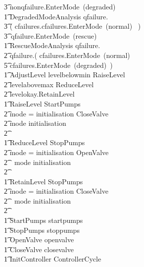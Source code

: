 \documentclass{report} %
\begin{document}
\begin{circus}
            \t3 nonqfailure.\true \then EnterMode~(degraded) \\
        \t1 DegradedModeAnalysis \circdef qfailure.\false \then \\
                \t3 ( cfailures.\true \then \Skip \extchoice cfailures.\false \then EnterMode~(normal) ~) \\
                \t3\ \extchoice qfailure.\true \then EnterMode~(rescue) \\
        \t1 RescueModeAnalysis \circdef qfailure.\true \then \Skip \extchoice \\
            \t2 qfailure.\false \then ( cfailures.\false \then EnterMode~(normal) \\
                \t5 \extchoice cfailures.\true \then EnterMode~(degraded)~) \\
        \t1 AdjustLevel \circdef  levelbelowmin \then RaiseLevel \extchoice \\ %
            \t2 levelabovemax \then ReduceLevel \extchoice  \\ %
            \t2 levelokay.\true \then RetainLevel \\
        \t1 RaiseLevel \circdef StartPumps \circseq\ \\
            \t2 \circif mode = initialisation \circthen CloseValve \\
            \t2 \circelse mode \neq initialisation \circthen \Skip \\
            \t2 \circfi  \\
        \t1 ReduceLevel \circdef StopPumps \circseq\ \\
            \t2 \circif mode = initialisation \circthen OpenValve \\
            \t2\ \ \circelse mode \neq initialisation \circthen \Skip \\
            \t2 \circfi  \\
        \t1 RetainLevel \circdef StopPumps \circseq\ \\
            \t2 \circif mode = initialisation \circthen CloseValve \\
            \t2\ \ \circelse mode \neq initialisation \circthen \Skip \\
            \t2 \circfi  \\
        \t1 StartPumps \circdef startpumps \then \Skip        \\ %
        \t1 StopPumps \circdef stoppumps \then \Skip         \\ %
        \t1 OpenValve \circdef openvalve \then \Skip         \\ %
        \t1 CloseValve \circdef closevalve \then \Skip \\
        \t1 \circspot \lschexpract InitController \rschexpract \circseq ControllerCycle \\
    \circend
\end{circus}
\end{document}
